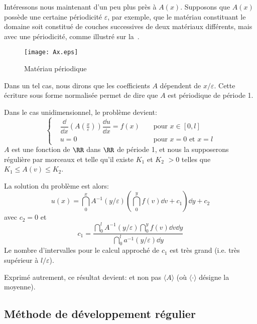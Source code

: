 \medskip
Intéressons nous maintenant d'un peu plus près à $A(x)$.
Supposons que $A(x)$ possède une certaine périodicité $\varepsilon$,
par exemple, que le matériau constituant le domaine soit constitué de couches successives
de deux matériaux différents, mais avec une périodicité, comme illustré sur la~.
\begin{figure}[ht]
\centering\texttt{[image: Ax.eps]}
\caption{Matériau périodique}\label{Fig-Ax}
\end{figure}
Dans un tel cas, nous dirons que les coefficients $A$ dépendent de $x/\varepsilon$.
Cette écriture sous forme normalisée permet de dire que $A$ est périodique de période 1.

\medskip
Dans le cas unidimensionnel, le problème devient:
\begin{equation}
\left\{
\begin{aligned}
&\dfrac \dd{\dd x}\left(A\left(\frac x\varepsilon\right)\right) \dfrac{\dd u}{\dd x} = f(x)&& \text{ pour } x\in[0,l]\\
&u=0 &&\text{ pour } x=0 \text{ et } x=l
\end{aligned}
\right.
\end{equation}
$A$ est une fonction de $\RR$ dans $\RR$ de période 1, et nous la supposerons régulière
par morceaux et telle qu'il existe $K_1$ et $K_2$ $>0$ telles que $K_1\le A(v)\le K_2$.

\medskip
La solution du problème est alors:
\begin{equation}
u(x)=\dint_0^x A^{-1}(y/\varepsilon) \left(\dint_0^y f(v)\dd v + c_1 \right) \dd y + c_2
\end{equation}
avec $c_2=0$ et
\begin{equation} c_1 = \dfrac{\dint_0^l A^{-1}(y/\varepsilon)\dint_0^y f(v)\dd v \dd y}{\dint_0^l a^{-1}(y/\varepsilon)\dd y} \end{equation}
Le nombre d'intervalles pour le calcul approché de $c_1$ est très grand (i.e. très supérieur
à $l/\varepsilon$).

Exprimé autrement, ce résultat devient:
 et non pas $\langle A\rangle$
(où $\langle\cdot\rangle$ désigne la moyenne).


\medskip
\subsection{Méthode de développement régulier}

